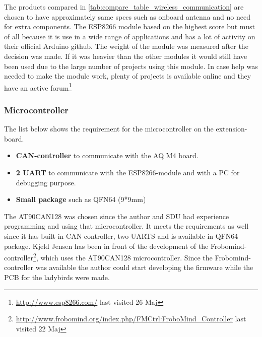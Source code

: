 The products compared in \ref{tab:compare_table_wireless_communication} are chosen to have approximately same specs such as onboard antenna and no need for extra components.
The ESP8266 module based on the highest score but must of all because it is use in a wide range of applications and has a lot of activity on their official Arduino github. The weight of the module was measured after the decision was made. If it was heavier than the other modules it would still have been used due to the large number of projects using this module. In case help was needed to make the module work, plenty of projects is available online and they have an active forum\footnote{\url{http://www.esp8266.com/} last visited 26 Maj}

\subsubsection*{Microcontroller}
The list below shows the requirement for the microcontroller on the extension-board.
\begin{itemize}
	\item \textbf{CAN-controller} to communicate with the AQ M4 board.
	\item \textbf{2 UART} to communicate with the ESP8266-module and with a PC for debugging purpose.
	\item \textbf{Small package} such as QFN64 (9*9mm)
\end{itemize}

The AT90CAN128 was chosen since the author and SDU had experience programming and using that microcontroller. It meets the requirements as well since it has built-in CAN controller,  two UARTS and is available in QFN64 package.
Kjeld Jensen has been in front of the development of the Frobomind-controller\footnote{\url{http://www.frobomind.org/index.php/FMCtrl:FroboMind\_Controller} last visited 22 Maj}, which uses the AT90CAN128 microcontroller.
Since the Frobomind-controller was available the author could start developing the firmware while the PCB for the ladybirds were made.

